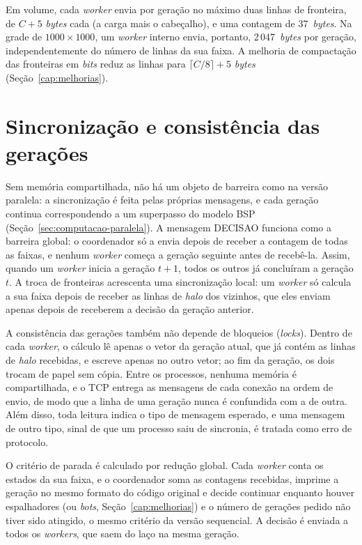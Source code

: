 Em volume, cada \textit{worker} envia por geração no máximo duas linhas de fronteira, de $C + 5$ \textit{bytes} cada (a carga mais o cabeçalho), e uma contagem de 37~\textit{bytes}. Na grade de $1000 \times 1000$, um \textit{worker} interno envia, portanto, 2\,047~\textit{bytes} por geração, independentemente do número de linhas da sua faixa. A melhoria de compactação das fronteiras em \textit{bits} reduz as linhas para $\lceil C/8 \rceil + 5$ \textit{bytes} (Seção~\ref{cap:melhorias}).

\section{Sincronização e consistência das gerações}\label{sec:sincronizacao-distribuida}

Sem memória compartilhada, não há um objeto de barreira como na versão paralela: a sincronização é feita pelas próprias mensagens, e cada geração continua correspondendo a um superpasso do modelo \ac{BSP} (Seção~\ref{sec:computacao-paralela}). A mensagem DECISAO funciona como a barreira global: o coordenador só a envia depois de receber a contagem de todas as faixas, e nenhum \textit{worker} começa a geração seguinte antes de recebê-la. Assim, quando um \textit{worker} inicia a geração $t+1$, todos os outros já concluíram a geração $t$. A troca de fronteiras acrescenta uma sincronização local: um \textit{worker} só calcula a sua faixa depois de receber as linhas de \textit{halo} dos vizinhos, que eles enviam apenas depois de receberem a decisão da geração anterior.

A consistência das gerações também não depende de bloqueios (\textit{locks}). Dentro de cada \textit{worker}, o cálculo lê apenas o vetor da geração atual, que já contém as linhas de \textit{halo} recebidas, e escreve apenas no outro vetor; ao fim da geração, os dois trocam de papel sem cópia. Entre os processos, nenhuma memória é compartilhada, e o \ac{TCP} entrega as mensagens de cada conexão na ordem de envio, de modo que a linha de uma geração nunca é confundida com a de outra. Além disso, toda leitura indica o tipo de mensagem esperado, e uma mensagem de outro tipo, sinal de que um processo saiu de sincronia, é tratada como erro de protocolo.

O critério de parada é calculado por redução global. Cada \textit{worker} conta os estados da sua faixa, e o coordenador soma as contagens recebidas, imprime a geração no mesmo formato do código original e decide continuar enquanto houver espalhadores (ou \textit{bots}, Seção~\ref{cap:melhorias}) e o número de gerações pedido não tiver sido atingido, o mesmo critério da versão sequencial. A decisão é enviada a todos os \textit{workers}, que saem do laço na mesma geração.

